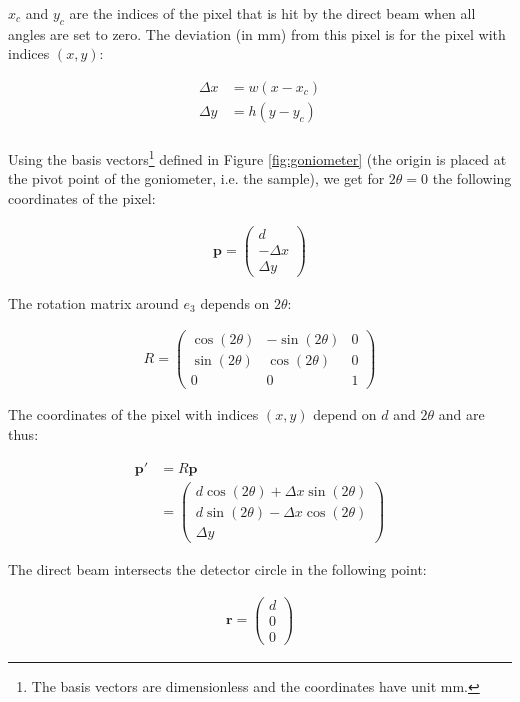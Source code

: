 \documentclass[a4paper, 12pt, twoside]{scrartcl}
\begin{document}
$ x_c $ and $ y_c $ are the indices of the pixel that is hit by the direct beam when all angles are set to zero. The deviation (in mm) from this pixel is for the pixel with indices $ (x, y) $:

\begin{align*}
	\Delta x &= w(x - x_c) \\
	\Delta y &= h(y - y_c) \\
\end{align*}

Using the basis vectors\footnote{The basis vectors are dimensionless and the coordinates have unit $ \mathrm{mm} $.} defined in Figure \ref{fig:goniometer} (the origin is placed at the pivot point of the goniometer, i.e. the sample), we get for $ 2\theta = 0 $ the following coordinates of the pixel:

\begin{align*}
  \boldsymbol{p} = \begin{pmatrix} d \\ -\Delta x \\ \Delta y \end{pmatrix}	
\end{align*}

The rotation matrix around $ e_3 $ depends on $ 2\theta $:

\begin{align*}
	R = \begin{pmatrix}
		    \cos(2\theta) & -\sin(2\theta) & 0 \\
		    \sin(2\theta) & \cos(2\theta)  & 0 \\
		    0 & 0 & 1
		\end{pmatrix}
\end{align*}

The coordinates of the pixel with indices $ (x, y) $ depend on $ d $ and $ 2\theta $ and are thus:

\begin{align*}
	\boldsymbol{p'} &= R \boldsymbol{p} \\
	 &=
	\begin{pmatrix}
	d \cos(2\theta) + \Delta x \sin(2\theta) \\
	d \sin(2\theta) - \Delta x \cos(2\theta) \\
	\Delta y
	\end{pmatrix}
\end{align*}

The direct beam intersects the detector circle in the following point:

\begin{align*}
	\boldsymbol{r} = \begin{pmatrix} d \\ 0 \\ 0 \end{pmatrix}
\end{align*}
\end{document}
